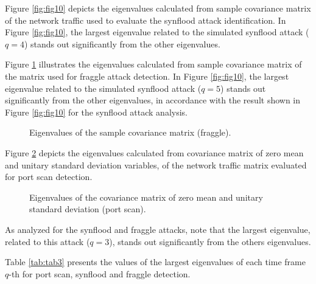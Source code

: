 \documentclass[review]{elsarticle}
\begin{document}
Figure \ref{fig:fig10} depicts the eigenvalues calculated from sample covariance matrix of the network traffic used to evaluate the synflood attack identification. In Figure \ref{fig:fig10}, the largest eigenvalue related to the simulated synflood attack ($q = 4$) stands out significantly from the other eigenvalues.

Figure \ref{fig:fig11} illustrates the eigenvalues calculated from sample covariance matrix of the matrix used for fraggle attack detection. In Figure \ref{fig:fig10}, the largest eigenvalue related to the simulated synflood attack ($q = 5$) stands out significantly from the other eigenvalues, in accordance with the result shown in Figure \ref{fig:fig10} for the synflood attack analysis.

\begin{figure}[h!]
	\centering
     \caption{Eigenvalues of the sample covariance matrix (fraggle).}
     \label{fig:fig11}
\end{figure}

Figure \ref{fig:fig12} depicts the eigenvalues calculated from covariance matrix of zero mean and unitary standard deviation variables, of the network traffic matrix evaluated for port scan detection. 

\begin{figure}[h!]
	\centering
     \caption{Eigenvalues of the covariance matrix of zero mean and unitary standard deviation (port scan).}
     \label{fig:fig12}
\end{figure}

As analyzed for the synflood and fraggle attacks, note that the largest eigenvalue, related to this attack ($q = 3$), stands out significantly from the others eigenvalues.

Table \ref{tab:tab3} presents the values of the largest eigenvalues of each time frame $q$-th for port scan, synflood and fraggle detection. 
\end{document}
